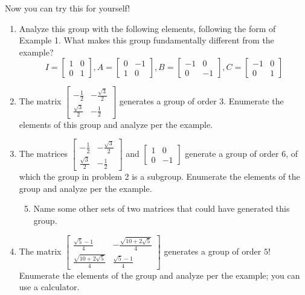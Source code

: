 \documentclass[../gatm.tex]{subfiles}
\begin{document}
Now you can try this for yourself!
\begin{enumerate}
\item Analyze this group with the following elements, following the form of Example 1. What makes this group fundamentally different from the example?
$$I=\left[\begin{array}{cc} 1 & 0 \\ 0 & 1 \end{array}\right], A=\left[\begin{array}{cc} 0 & -1 \\ 1 & 0 \end{array}\right], B=\left[\begin{array}{cc} -1 & 0 \\ 0 & -1 \end{array}\right], C=\left[\begin{array}{cc} -1 & 0 \\ 0 & 1 \end{array}\right]$$
\item The matrix $\left[\begin{array}{cc} -\frac{1}{2} & -\frac{\sqrt{3}}{2} \\ \frac{\sqrt{3}}{2} & -\frac{1}{2}\end{array}\right]$ generates a group of order $3$. Enumerate the elements of this group and analyze per the example.
\item The matrices $\left[\begin{array}{cc} -\frac{1}{2} & -\frac{\sqrt{3}}{2} \\ \frac{\sqrt{3}}{2} & -\frac{1}{2}\end{array}\right]$ and $\left[\begin{array}{cc} 1 & 0 \\ 0 & -1 \end{array}\right]$ generate a group of order $6$, of which the group in problem 2 is a subgroup. Enumerate the elements of the group and analyze per the example.
\begin{enumerate}
\setcounter{enumii}{4}
\item Name some other sets of two matrices that could have generated this group.
\end{enumerate}
\item The matrix $\left[\begin{array}{cc} \frac{\sqrt{5}-1}{4} & -\frac{\sqrt{10+2\sqrt{5}}}{4} \\ \frac{\sqrt{10+2\sqrt{5}}}{4} & \frac{\sqrt{5}-1}{4} \end{array}\right]$ generates a group of order $5$! Enumerate the elements of the group and analyze per the example; you can use a calculator.

\end{enumerate}
\end{document}
